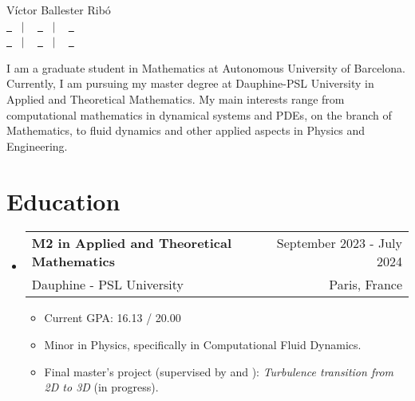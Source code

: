 \documentclass[a4paper,11pt]{article}
\makeatletter
\newcommand{\resumeQuadHeading}[4]{
  \item
  \begin{tabular*}{0.96\textwidth}[t]{l@{\extracolsep{\fill}}r}
    \textbf{#1} & \small #2 \\
    \small#3 & \small #4 \\
  \end{tabular*}
}
\newcommand{\resumeHeadingListStart}{
  \begin{itemize}[leftmargin=0.15in, label={}]
}
\newcommand{\resumeHeadingListEnd}{\end{itemize}}
\makeatother
\begin{document}
\begin{center}
  {\Huge Víctor Ballester Ribó\vspace{2pt}} \\[1.25pc]
  \href{https://victorballester7.github.io}{\faLink \ } \ $|$ \ %
  \href{https://www.linkedin.com/in/victorballester7}{\faLinkedinSquare \ } \ $|$ \ %
  \href{https://www.github.com/victorballester7}{\faGithub \ } \\[0.1pc] %
  \href{tel:+33765750262}{\faPhone \ } \ $|$ \ %
  \href{mailto:victor.ballester-ribo@dauphine.eu}{\faEnvelope \ } \ $|$ \ %
  \href{https://maps.app.goo.gl/mBsBKy4iHiBFkVGz5}{\faHome \ } \\[1.5pc] %
\end{center}

\begin{justify}
  I am a graduate student in Mathematics at Autonomous University of Bar\-ce\-lo\-na. Currently, I am pursuing my master degree at Dauphine-PSL University in Applied and Theoretical Mathematics. My main interests range from computational mathematics in dynamical systems and PDEs, on the branch of Math\-e\-mat\-ics, to fluid dynamics and other applied aspects in Physics and Engineering.
\end{justify}



\section{Education}
\resumeHeadingListStart{}
\resumeQuadHeading{M2 in Applied and Theoretical Mathematics}{September 2023 - July 2024}
{Dauphine - PSL University}{Paris, France}
\begin{itemize}[leftmargin=3em, itemsep=0.1em, topsep=2pt]
  \item \small Current GPA: 16.13 / 20.00
  \item \small Minor in Physics, specifically in Computational Fluid Dynamics.
  \item \small Final master's project (supervised by \href{https://www.phys.ens.fr/~alexakis/}{} and \href{https://www.math.ens.psl.eu/~dormy/}{}): \textit{Turbulence transition from 2D to 3D} (in progress).
\end{itemize}
\resumeHeadingListEnd{}
\end{document}
